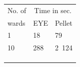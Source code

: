  \begin{figure}
\centering
\begin{subfigure}{.4\textwidth}
  \centering
  {

\small
\begin{tabular}[b]{p{1.4cm} p{1cm} p{1cm}}
\hline

No. of & \multicolumn{2}{c}{Time in sec.}\\
 wards & EYE & Pellet\\
\hline
\hline
1 & 18 & 79\\
10 & 288 & 2~124\\
\hline
&&\\
&&\\
&&\\
\end{tabular} 
\

\normalsize

}
\end{subfigure}
\end{figure}
